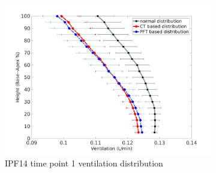 \begin{figure}[htbp]  
\centering
\begin{subfigure}{.6\linewidth}%
  \includegraphics[width=\linewidth,trim={{.0\wd0} {.0\wd0} {.0\wd0} {.0\wd0}},clip]{Appendix/Image_AppexB/IPF1401/IPF1401_VentilationAgainstLungHeight.jpg} %
  \caption{IPF14 time point 1 ventilation distribution}
  \label{fig:IPF1401VQDistribution-a} 
\end{subfigure} 
\begin{subfigure}{.6\linewidth}%

\end{subfigure}
\end{figure}
